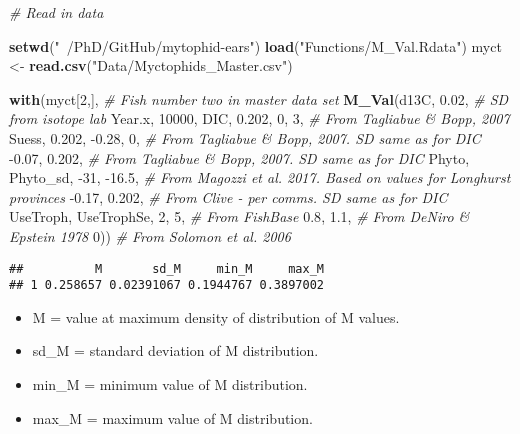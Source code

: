 \documentclass[]{article}
\newenvironment{Shaded}{\begin{snugshade}}{\end{snugshade}}
\newcommand{\CommentTok}[1]{\textcolor[rgb]{0.56,0.35,0.01}{\textit{#1}}}
\newcommand{\DecValTok}[1]{\textcolor[rgb]{0.00,0.00,0.81}{#1}}
\newcommand{\FloatTok}[1]{\textcolor[rgb]{0.00,0.00,0.81}{#1}}
\newcommand{\KeywordTok}[1]{\textcolor[rgb]{0.13,0.29,0.53}{\textbf{#1}}}
\newcommand{\NormalTok}[1]{#1}
\newcommand{\StringTok}[1]{\textcolor[rgb]{0.31,0.60,0.02}{#1}}
\providecommand{\tightlist}{%
  \setlength{\itemsep}{0pt}\setlength{\parskip}{0pt}}
\begin{document}
\begin{Shaded}
\begin{Highlighting}[]
\CommentTok{# Read in data}

\KeywordTok{setwd}\NormalTok{(}\StringTok{"~/PhD/GitHub/mytophid-ears"}\NormalTok{)}
\KeywordTok{load}\NormalTok{(}\StringTok{"Functions/M_Val.Rdata"}\NormalTok{)}
\NormalTok{myct <-}\StringTok{ }\KeywordTok{read.csv}\NormalTok{(}\StringTok{"Data/Myctophids_Master.csv"}\NormalTok{)}

\KeywordTok{with}\NormalTok{(myct[}\DecValTok{2}\NormalTok{,], }\CommentTok{# Fish number two in master data set}
     \KeywordTok{M_Val}\NormalTok{(d13C, }\FloatTok{0.02}\NormalTok{, }
           \CommentTok{# SD from isotope lab}
\NormalTok{           Year.x, }\DecValTok{10000}\NormalTok{,}
\NormalTok{           DIC, }\FloatTok{0.202}\NormalTok{, }\DecValTok{0}\NormalTok{, }\DecValTok{3}\NormalTok{, }
           \CommentTok{# From Tagliabue & Bopp, 2007}
\NormalTok{           Suess, }\FloatTok{0.202}\NormalTok{, }\FloatTok{-0.28}\NormalTok{, }\DecValTok{0}\NormalTok{, }
           \CommentTok{# From Tagliabue & Bopp, 2007. SD same as for DIC}
           \FloatTok{-0.07}\NormalTok{, }\FloatTok{0.202}\NormalTok{, }
           \CommentTok{# From Tagliabue & Bopp, 2007. SD same as for DIC}
\NormalTok{           Phyto, Phyto_sd, }\DecValTok{-31}\NormalTok{, }\FloatTok{-16.5}\NormalTok{, }
           \CommentTok{# From Magozzi et al. 2017. Based on values for Longhurst provinces}
           \FloatTok{-0.17}\NormalTok{, }\FloatTok{0.202}\NormalTok{, }
           \CommentTok{# From Clive - per comms. SD same as for DIC}
\NormalTok{           UseTroph, UseTrophSe, }\DecValTok{2}\NormalTok{, }\DecValTok{5}\NormalTok{, }
           \CommentTok{# From FishBase}
           \FloatTok{0.8}\NormalTok{, }\FloatTok{1.1}\NormalTok{, }
           \CommentTok{# From DeNiro & Epstein 1978}
           \DecValTok{0}\NormalTok{)) }\CommentTok{# From Solomon et al. 2006}
\end{Highlighting}
\end{Shaded}

\begin{verbatim}
##          M       sd_M     min_M     max_M
## 1 0.258657 0.02391067 0.1944767 0.3897002
\end{verbatim}

\begin{itemize}
\tightlist
\item
  M = value at maximum density of distribution of M values.
\item
  sd\_M = standard deviation of M distribution.
\item
  min\_M = minimum value of M distribution.
\item
  max\_M = maximum value of M distribution.
\end{itemize}
\end{document}
